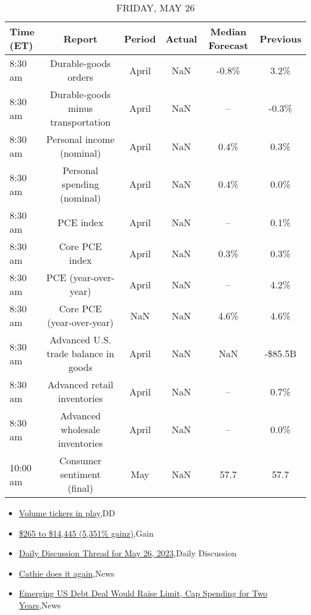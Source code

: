 \documentclass{article}%
\begin{document}
\begin{table}[htbp]%
\caption{FRIDAY, MAY 26}%
\centering%
\begin{adjustbox}{width=1\textwidth}%
\begin{tabular}{lccccc}
\toprule
Time (ET) &                               Report & Period & Actual & Median Forecast & Previous \\
\midrule
  8:30 am &                 Durable-goods orders &  April &    NaN &           -0.8\% &     3.2\% \\
  8:30 am &   Durable-goods minus transportation &  April &    NaN &              -- &    -0.3\% \\
  8:30 am &            Personal income (nominal) &  April &    NaN &            0.4\% &     0.3\% \\
  8:30 am &          Personal spending (nominal) &  April &    NaN &            0.4\% &     0.0\% \\
  8:30 am &                            PCE index &  April &    NaN &              -- &     0.1\% \\
  8:30 am &                       Core PCE index &  April &    NaN &            0.3\% &     0.3\% \\
  8:30 am &                 PCE (year-over-year) &  April &    NaN &              -- &     4.2\% \\
  8:30 am &            Core PCE (year-over-year) &    NaN &    NaN &            4.6\% &     4.6\% \\
  8:30 am & Advanced U.S. trade balance in goods &  April &    NaN &             NaN &  -\$85.5B \\
  8:30 am &          Advanced retail inventories &  April &    NaN &              -- &     0.7\% \\
  8:30 am &       Advanced wholesale inventories &  April &    NaN &              -- &     0.0\% \\
 10:00 am &           Consumer sentiment (final) &    May &    NaN &            57.7 &     57.7 \\
\bottomrule
\end{tabular}
%
\end{adjustbox}%
\end{table}

%
\begin{itemize}%
\item%
\href{https://reddit.com/r/wallstreetbets/comments/13sbc5s/volume\_tickers\_in\_play/}{Volume tickers in play},DD%
\item%
\href{https://reddit.com/r/wallstreetbets/comments/13safz6/265\_to\_14445\_5351\_gainz/}{\$265 to \$14,445 (5,351\% gainz)},Gain%
\item%
\href{https://reddit.com/r/wallstreetbets/comments/13s8tul/daily\_discussion\_thread\_for\_may\_26\_2023/}{Daily Discussion Thread for May 26, 2023},Daily Discussion%
\item%
\href{https://reddit.com/r/StockMarket/comments/13rvexu/cathie\_does\_it\_again/}{Cathie does it again},News%
\item%
\href{https://reddit.com/r/Economics/comments/13s8edr/emerging\_us\_debt\_deal\_would\_raise\_limit\_cap/}{Emerging US Debt Deal Would Raise Limit, Cap Spending for Two Years},News%
\end{itemize}%
\end{document}
